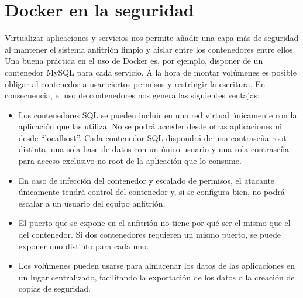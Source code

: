\section{Docker en la seguridad}
Virtualizar aplicaciones y servicios nos permite añadir una capa más de seguridad al mantener el sistema anfitrión limpio y aislar entre los contenedores entre ellos. Una buena práctica en el uso de Docker es, por ejemplo, disponer de un contenedor MySQL para cada servicio. A la hora de montar volúmenes es posible obligar al contenedor a usar ciertos permisos y restringir la escritura. En consecuencia, el uso de contenedores nos genera las siguientes ventajas:
\begin{itemize}
    \item Los contenedores SQL se pueden incluir en una red virtual únicamente con la aplicación que las utiliza. No se podrá acceder desde otras aplicaciones ni desde \enquote{localhost}. Cada contenedor SQL dispondrá de una contraseña root distinta, una sola base de datos con un único usuario y una sola contraseña para acceso exclusivo no-root de la aplicación que lo consume.
    \item En caso de infección del contenedor y escalado de permisos, el atacante únicamente tendrá control del contenedor y, si se configura bien, no podrá escalar a un usuario del equipo anfitrión. 
    \item El puerto que se expone en el anfitrión no tiene por qué ser el mismo que el del contenedor. Si dos contenedores requieren un mismo puerto, se puede exponer uno distinto para cada uno.
    \item Los volúmenes pueden usarse para almacenar los datos de las aplicaciones en un lugar centralizado, facilitando la exportación de los datos o la creación de copias de seguridad.
\end{itemize}